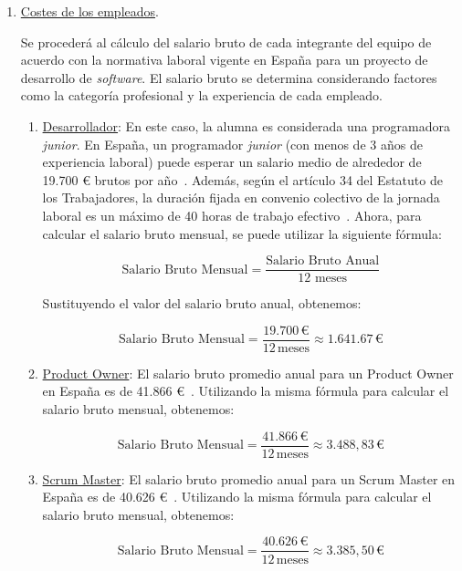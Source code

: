 \begin{enumerate}
    \item \underline{Costes de los empleados}.
    
    Se procederá al cálculo del salario bruto de cada integrante del equipo de acuerdo con la normativa laboral vigente en España para un proyecto de desarrollo de \textit{software}. El salario bruto se determina considerando factores como la categoría profesional y la experiencia de cada empleado.

    \begin{enumerate}
        \item \underline{Desarrollador}: En este caso, la alumna es considerada una programadora \textit{junior}. En España, un programador \textit{junior} (con menos de 3 años de experiencia laboral) puede esperar un salario medio de alrededor de 19.700 € brutos por año~\cite{Jobted}. Además, según el artículo 34 del Estatuto de los Trabajadores, la duración fijada en convenio colectivo de la jornada laboral es un máximo de 40 horas de trabajo efectivo~\cite{jornadalaboral}. Ahora, para calcular el salario bruto mensual, se puede utilizar la siguiente fórmula:

        \[
        \text{{Salario Bruto Mensual}} = \frac{{\text{{Salario Bruto Anual}}}}{{12 \text{{ meses}}}}
        \]
        
        Sustituyendo el valor del salario bruto anual, obtenemos:
        
        \[
        \text{{Salario Bruto Mensual}} = \frac{{19.700 \, \text{{€}}}}{{12 \, \text{{meses}}}} \approx 1.641.67 \, \text{{€}}
        \]

        \item \underline{Product Owner}: El salario bruto promedio anual para un Product Owner en España es de 41.866 €~\cite{PayScale2}. Utilizando la misma fórmula para calcular el salario bruto mensual, obtenemos:

        \[\text{{Salario Bruto Mensual}} = \frac{{41.866 \, \text{{€}}}}{{12 \, \text{{meses}}}} \approx 3.488,83 \, \text{{€}}\]
        
        \item \underline{Scrum Master}: El salario bruto promedio anual para un Scrum Master en España es de 40.626 €~\cite{PayScale1}. Utilizando la misma fórmula para calcular el salario bruto mensual, obtenemos:
        
        \[\text{{Salario Bruto Mensual}} = \frac{{40.626 \, \text{{€}}}}{{12 \, \text{{meses}}}} \approx 3.385,50 \, \text{{€}}\]
        

\end{enumerate}
\end{enumerate}
